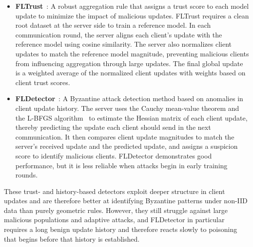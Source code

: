 \documentclass[journal]{IEEEtran}
\begin{document}
\begin{itemize}
    \item \textbf{FLTrust}~\cite{cao2020fltrust}: A robust aggregation rule that assigns a trust score to each model update to minimize the impact of malicious updates. FLTrust requires a clean root dataset at the server side to train a reference model. In each communication round, the server aligns each client's update with the reference model using cosine similarity. The server also normalizes client updates to match the reference model magnitude, preventing malicious clients from influencing aggregation through large updates. The final global update is a weighted average of the normalized client updates with weights based on client trust scores.

    \item \textbf{FLDetector}~\cite{zhang2022fldetector}: A Byzantine attack detection method based on anomalies in client update history. The server uses the Cauchy mean-value theorem and the L-BFGS algorithm~\cite{liu1989limited} to estimate the Hessian matrix of each client update, thereby predicting the update each client should send in the next communication. It then compares client update magnitudes to match the server's received update and the predicted update, and assigns a suspicion score to identify malicious clients. FLDetector demonstrates good performance, but it is less reliable when attacks begin in early training rounds.
\end{itemize}

These trust- and history-based detectors exploit deeper structure in client updates and are therefore better at identifying Byzantine patterns under non-IID data than purely geometric rules. However, they still struggle against large malicious populations and adaptive attacks, and FLDetector in particular requires a long benign update history and therefore reacts slowly to poisoning that begins before that history is established.
\end{document}
